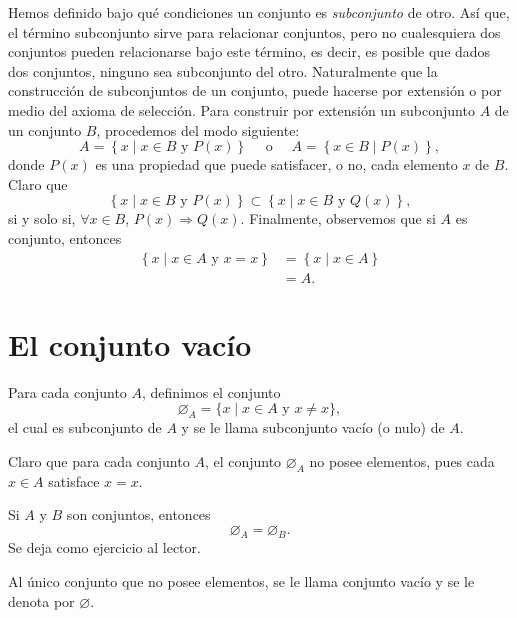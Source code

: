 Hemos definido bajo qué condiciones un conjunto es \emph{subconjunto} de otro. Así que, el término subconjunto sirve para relacionar conjuntos, pero no cualesquiera dos conjuntos pueden relacionarse bajo este término, es decir, es posible que dados dos conjuntos, ninguno sea subconjunto del otro. Naturalmente que la construcción de subconjuntos de un conjunto, puede hacerse por extensión o por medio del axioma de selección. Para construir por extensión un subconjunto $A$ de un conjunto $B$, procedemos del modo siguiente:
$$A = \left\{ x \mid x \in B \text{ y } P(x) \right\} \quad \text{ o } \quad A = \left\{ x \in B \mid P(x) \right\},$$
donde $P(x)$ es una propiedad que puede satisfacer, o no, cada elemento $x$ de $B$. Claro que
$$\left\{ x \mid x \in B \text{ y } P(x) \right\} \subset \left\{ x \mid x \in B \text{ y } Q(x) \right\},$$
si y solo si, $\forall x \in B$, $P(x) \Longrightarrow Q(x)$. Finalmente, observemos que si $A$ es conjunto, entonces
\begin{align*}
    \left\{ x \mid x \in A \text{ y } x = x \right\} & = \left\{ x \mid x \in A \right\} \\
    & = A.
\end{align*}

\section{El conjunto vacío}

\begin{definicion}{}{}
    Para cada conjunto $A$, definimos el conjunto
    $$\varnothing_A = \{x \mid x \in A \text { y } x \neq x\},$$
    el cual es subconjunto de $A$ y se le llama subconjunto vacío (o nulo) de $A$.
\end{definicion}

Claro que para cada conjunto $A$, el conjunto $\varnothing_A$ no posee elementos, pues cada $x \in A$ satisface $x = x$.

\begin{prop}{}{}
    Si $A$ y $B$ son conjuntos, entonces
    $$\varnothing_A = \varnothing_B.$$
    \demostracion Se deja como ejercicio al lector.
\end{prop}

\newpage

\begin{definicion}{}{}
    Al único conjunto que no posee elementos, se le llama conjunto vacío y se le denota por $\varnothing$.
\end{definicion}

